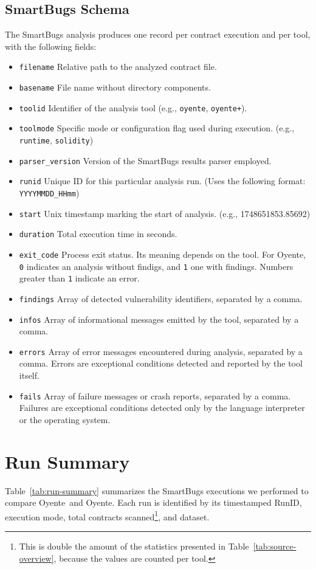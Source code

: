 \documentclass{article}
\newcommand\OY{Oyente}
\newcommand\OYp{\OY\raisebox{0.3ex}{\smaller +}}
\begin{document}
	\subsection{SmartBugs Schema}
	The SmartBugs analysis produces one record per contract execution and per tool, with the following fields:

	\begin{itemize}
		\item \texttt{filename} Relative path to the analyzed contract file.
		\item \texttt{basename} File name without directory components.
		\item \texttt{toolid} Identifier of the analysis tool (e.g., \texttt{oyente}, \texttt{oyente+}).
		\item \texttt{toolmode} Specific mode or configuration flag used during execution. (e.g., \texttt{runtime}, \texttt{solidity})
		\item \texttt{parser\_version} Version of the SmartBugs results parser employed.
		\item \texttt{runid} Unique ID for this particular analysis run. (Uses the following format:  \texttt{YYYYMMDD\_HHmm})
		\item \texttt{start} Unix timestamp marking the start of analysis. (e.g., 1748651853.85692)
		\item \texttt{duration} Total execution time in seconds.
		\item \texttt{exit\_code} Process exit status. Its meaning depends on the tool. For \OY, \texttt{0} indicates an analysis without findigs, and \texttt{1} one with findings. Numbers greater than \texttt{1} indicate an error.
		\item \texttt{findings} Array of detected vulnerability identifiers, separated by a comma.
		\item \texttt{infos} Array of informational messages emitted by the tool, separated by a comma.
		\item \texttt{errors} Array of error messages encountered during analysis, separated by a comma. Errors are exceptional conditions detected and reported by the tool itself.
		\item \texttt{fails} Array of failure messages or crash reports, separated by a comma. Failures are exceptional conditions detected only by the language interpreter or the operating system.
	\end{itemize}

	\section{Run Summary}
	Table~\ref{tab:run-summary} summarizes the SmartBugs executions we performed to compare \OY\ and \OYp. Each run is identified by its timestamped RunID, execution mode, total contracts scanned\footnote{This is double the amount of the statistics presented in Table~\ref{tab:source-overview}, because the values are counted per tool.}, and dataset.
\end{document}
